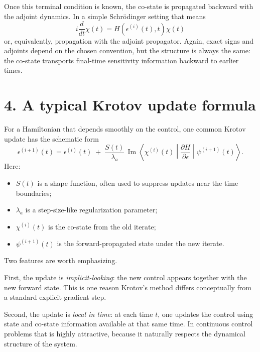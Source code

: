 \documentclass[11pt]{article}
\begin{document}
Once this terminal condition is known, the co-state is propagated backward with the adjoint dynamics. In a simple Schr\"odinger setting that means
\begin{equation}
i \frac{d}{dt}\chi(t) = H(\epsilon^{(i)}(t), t)\chi(t)
\end{equation}
or, equivalently, propagation with the adjoint propagator. Again, exact signs and adjoints depend on the chosen convention, but the structure is always the same: the co-state transports final-time sensitivity information backward to earlier times.

\section*{4. A typical Krotov update formula}
For a Hamiltonian that depends smoothly on the control, one common Krotov update has the schematic form
\begin{equation}
\epsilon^{(i+1)}(t)
=
\epsilon^{(i)}(t)
\;+\;
\frac{S(t)}{\lambda_a}
\,
\operatorname{Im}
\left\langle
\chi^{(i)}(t)
\middle|
\frac{\partial H}{\partial \epsilon}
\middle|
\psi^{(i+1)}(t)
\right\rangle .
\label{eq:krotov_update}
\end{equation}
Here:
\begin{itemize}
\item $S(t)$ is a shape function, often used to suppress updates near the time boundaries;
\item $\lambda_a$ is a step-size-like regularization parameter;
\item $\chi^{(i)}(t)$ is the co-state from the old iterate;
\item $\psi^{(i+1)}(t)$ is the forward-propagated state under the new iterate.
\end{itemize}

Two features are worth emphasizing.

First, the update is \emph{implicit-looking}: the new control appears together with the new forward state. This is one reason Krotov's method differs conceptually from a standard explicit gradient step.

Second, the update is \emph{local in time}: at each time $t$, one updates the control using state and co-state information available at that same time. In continuous control problems that is highly attractive, because it naturally respects the dynamical structure of the system.
\end{document}
